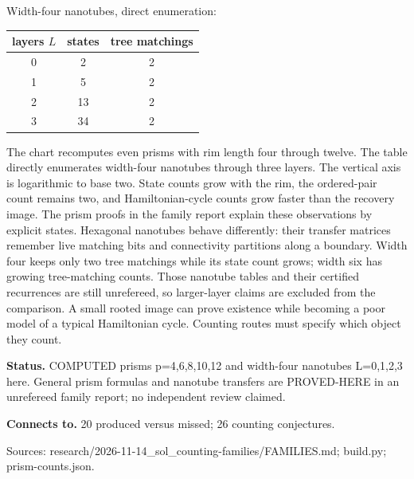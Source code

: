\begin{center}
\begin{minipage}{.86\textwidth}
\par\bigskip Width-four nanotubes, direct enumeration:\par \begin{tabular}{ccc}\hline
layers $L$ & states & tree matchings\\\hline
0 & 2 & 2\\
1 & 5 & 2\\
2 & 13 & 2\\
3 & 34 & 2\\
\hline\end{tabular}
\end{minipage}\end{center}
The chart recomputes even prisms with rim length four through twelve. The table directly enumerates width-four nanotubes through three layers. The vertical axis is logarithmic to base two. State counts grow with the rim, the ordered-pair count remains two, and Hamiltonian-cycle counts grow faster than the recovery image. The prism proofs in the family report explain these observations by explicit states. Hexagonal nanotubes behave differently: their transfer matrices remember live matching bits and connectivity partitions along a boundary. Width four keeps only two tree matchings while its state count grows; width six has growing tree-matching counts. Those nanotube tables and their certified recurrences are still unrefereed, so larger-layer claims are excluded from the comparison. A small rooted image can prove existence while becoming a poor model of a typical Hamiltonian cycle. Counting routes must specify which object they count.

\textbf{Status.} COMPUTED prisms p=4,6,8,10,12 and width-four nanotubes L=0,1,2,3 here. General prism formulas and nanotube transfers are PROVED-HERE in an unrefereed family report; no independent review claimed.

\textbf{Connects to.} 20 produced versus missed; 26 counting conjectures.

{\footnotesize\raggedright Sources: research/\allowbreak{}2026-11-14\_sol\_counting-families/\allowbreak{}FAMILIES.md;\allowbreak{} build.py;\allowbreak{} prism-counts.json.\par}

